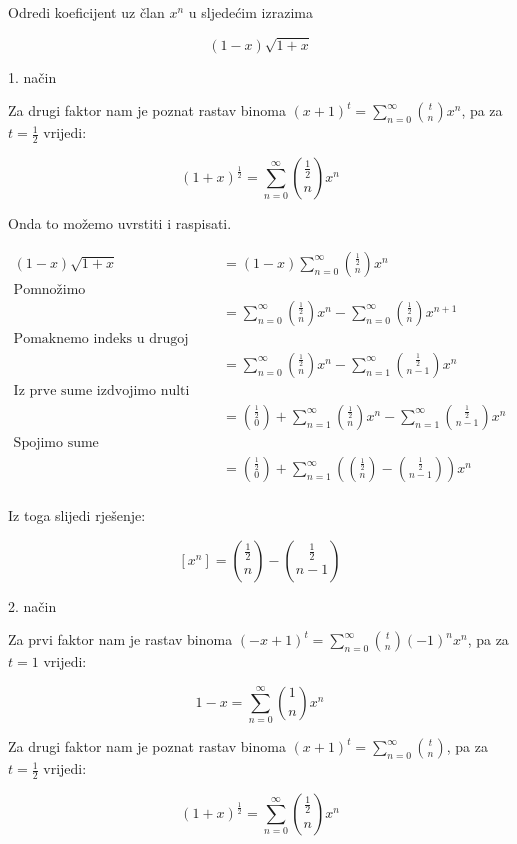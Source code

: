 \documentclass{article}
\begin{document}
	Odredi koeficijent uz član \( x^n \) u sljedećim izrazima
	
	\[ (1 - x) \sqrt{1 + x} \]
	
	1. način
	
	Za drugi faktor nam je poznat rastav binoma \( (x + 1)^t = \sum\limits^\infty_{n=0} \binom{t}{n} x^n \), pa za \( t = \frac{1}{2} \) vrijedi:
	
	\[ (1 + x)^{\frac{1}{2}} = \sum\limits^\infty_{n=0} \binom{\frac{1}{2}}{n} x^n \]
	
	Onda to možemo uvrstiti i raspisati.
	
	\begin{align*}
		(1 - x) \sqrt{1 + x} &= (1 - x) \sum\limits^\infty_{n=0} \binom{\frac{1}{2}}{n} x^n \\
		\text{Pomnožimo} \\
		&= \sum\limits^\infty_{n=0} \binom{\frac{1}{2}}{n} x^n - \sum\limits^\infty_{n=0} \binom{\frac{1}{2}}{n} x^{n + 1} \\
		\text{Pomaknemo indeks u drugoj sumi} \\
		&= \sum\limits^\infty_{n=0} \binom{\frac{1}{2}}{n} x^n - \sum\limits^\infty_{n=1} \binom{\frac{1}{2}}{n - 1} x^{n} \\
		\text{Iz prve sume izdvojimo nulti element} \\
		&= \binom{\frac{1}{2}}{0} + \sum\limits^\infty_{n=1} \binom{\frac{1}{2}}{n} x^n - \sum\limits^\infty_{n=1} \binom{\frac{1}{2}}{n - 1} x^{n} \\
		\text{Spojimo sume} \\
		&= \binom{\frac{1}{2}}{0} + \sum\limits^\infty_{n=1} \left ( \binom{\frac{1}{2}}{n} -  \binom{\frac{1}{2}}{n - 1} \right ) x^{n} \\
	\end{align*}
	
	Iz toga slijedi rješenje:
	
	\[ [x^n] = \binom{\frac{1}{2}}{n} - \binom{\frac{1}{2}}{n - 1} \] 	
	
	2. način
	
	Za prvi faktor nam je rastav binoma \( (-x + 1)^t = \sum\limits^\infty_{n=0} \binom{t}{n} (-1)^n x^n \), pa za \( t = 1 \) vrijedi:
	
	\[ 1 - x = \sum\limits^\infty_{n=0} \binom{1}{n} x^n \]
	
	Za drugi faktor nam je poznat rastav binoma \( (x + 1)^t = \sum\limits^\infty_{n=0} \binom{t}{n} \), pa za \( t = \frac{1}{2} \) vrijedi:
	
	\[ (1 + x)^{\frac{1}{2}} = \sum\limits^\infty_{n=0} \binom{\frac{1}{2}}{n} x^n \]
	
\end{document}
